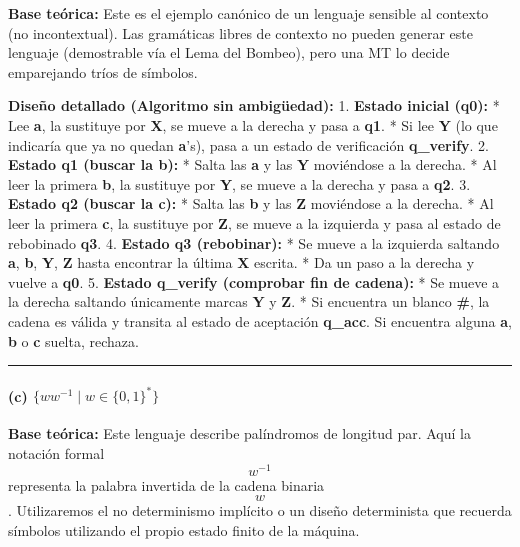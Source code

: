 \documentclass[12pt]{book} %
\begin{document}
\textbf{Base teórica:} Este es el ejemplo canónico de un lenguaje
sensible al contexto (no incontextual). Las gramáticas libres de
contexto no pueden generar este lenguaje (demostrable vía el Lema del
Bombeo), pero una MT lo decide emparejando tríos de símbolos.

\textbf{Diseño detallado (Algoritmo sin ambigüedad):} 1. \textbf{Estado
inicial (q0):} * Lee \textbf{a}, la sustituye por \textbf{X}, se mueve a
la derecha y pasa a \textbf{q1}. * Si lee \textbf{Y} (lo que indicaría
que ya no quedan \textbf{a}'s), pasa a un estado de verificación
\textbf{q\_verify}. 2. \textbf{Estado q1 (buscar la b):} * Salta las
\textbf{a} y las \textbf{Y} moviéndose a la derecha. * Al leer la
primera \textbf{b}, la sustituye por \textbf{Y}, se mueve a la derecha y
pasa a \textbf{q2}. 3. \textbf{Estado q2 (buscar la c):} * Salta las
\textbf{b} y las \textbf{Z} moviéndose a la derecha. * Al leer la
primera \textbf{c}, la sustituye por \textbf{Z}, se mueve a la izquierda
y pasa al estado de rebobinado \textbf{q3}. 4. \textbf{Estado q3
(rebobinar):} * Se mueve a la izquierda saltando \textbf{a}, \textbf{b},
\textbf{Y}, \textbf{Z} hasta encontrar la última \textbf{X} escrita. *
Da un paso a la derecha y vuelve a \textbf{q0}. 5. \textbf{Estado
q\_verify (comprobar fin de cadena):} * Se mueve a la derecha saltando
únicamente marcas \textbf{Y} y \textbf{Z}. * Si encuentra un blanco
\textbf{\#}, la cadena es válida y transita al estado de aceptación
\textbf{q\_acc}. Si encuentra alguna \textbf{a}, \textbf{b} o \textbf{c}
suelta, rechaza.

\begin{center}\rule{0.5\linewidth}{0.5pt}\end{center}

\hypertarget{c-ww-1-mid-w-in-01}{%
\paragraph{\texorpdfstring{(c)
\(\{ww^{-1} \mid w \in \{0,1\}^*\}\)}{(c) \textbackslash\{ww\^{}\{-1\} \textbackslash mid w \textbackslash in \textbackslash\{0,1\textbackslash\}\^{}*\textbackslash\}}}\label{c-ww-1-mid-w-in-01}}

\textbf{Base teórica:} Este lenguaje describe palíndromos de longitud
par. Aquí la notación formal \[w^{-1}\] representa la palabra invertida
de la cadena binaria \[w\]. Utilizaremos el no determinismo implícito o
un diseño determinista que recuerda símbolos utilizando el propio estado
finito de la máquina.
\end{document}
